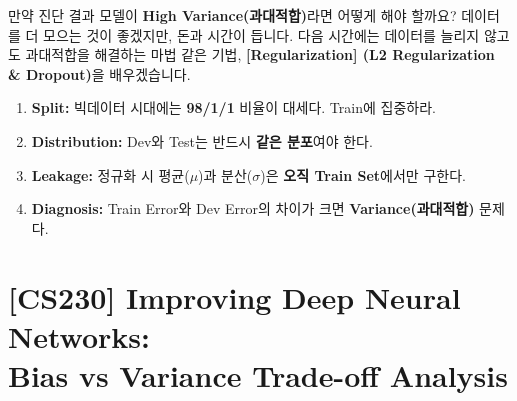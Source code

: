 \documentclass[11pt,a4paper]{book}
\theoremstyle{definition}
\begin{document}
만약 진단 결과 모델이 \textbf{High Variance(과대적합)}라면 어떻게 해야 할까요? 데이터를 더 모으는 것이 좋겠지만, 돈과 시간이 듭니다.
다음 시간에는 데이터를 늘리지 않고도 과대적합을 해결하는 마법 같은 기법, \textbf{[Regularization] (L2 Regularization \& Dropout)}을 배우겠습니다.

\vspace{0.5cm}

\begin{summarybox}[title={단원 요약 (Cheat Sheet)}]
\begin{enumerate}
    \item \textbf{Split:} 빅데이터 시대에는 \textbf{98/1/1} 비율이 대세다. Train에 집중하라.
    \item \textbf{Distribution:} Dev와 Test는 반드시 \textbf{같은 분포}여야 한다.
    \item \textbf{Leakage:} 정규화 시 평균($\mu$)과 분산($\sigma$)은 \textbf{오직 Train Set}에서만 구한다.
    \item \textbf{Diagnosis:} Train Error와 Dev Error의 차이가 크면 \textbf{Variance(과대적합)} 문제다.
  \end{enumerate}
\end{summarybox}


\chapter{[CS230] Improving Deep Neural Networks: \\ Bias vs Variance Trade-off Analysis}
\label{ch:lecture12}

\end{document}
